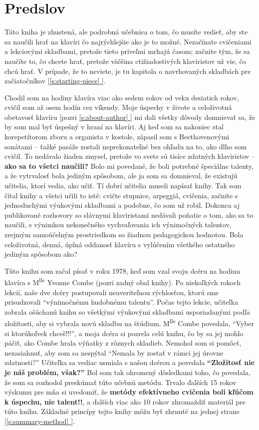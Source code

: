 \documentclass[11pt,a4paper]{book}
\newcommand*{\fullref}[1]{\hyperref[{#1}]{\ref*{#1} \nameref*{#1}}} %
\newcommand*{\fullrefp}[1]{[\fullref{#1}]} %
\begin{document}
\chapter*{Predslov}
Táto kniha je zhustená, ale podrobná učebnica o tom, čo musíte vedieť, aby ste sa naučili hrať na klavíri čo najrýchlejšie ako je to možné. Nezačínate cvičeniami a lekciovými skladbami, pretože tieto priveľmi mrhajú časom; začnite tým, že sa naučíte to, čo chcete hrať, pretože väčšina ctižiadostivých klaviristov už vie, čo chcú hrať. V prípade, že to neviete, je tu kapitola o navrhovaných skladbách pre začiatočníkov \fullrefp{s:starting-piece}.

Chodil som na hodiny klavíra viac ako sedem rokov od veku desiatich rokov, cvičil som až osem hodín cez víkendy. Moje úspechy v živote a celoživotná obetavosť klavíru [pozri \fullref{s:about-author}] mi dali všetky dôvody domnievať sa, že by som mal byť úspešný v hraní na klavíri. Aj keď som sa nakoniec stal korepetítorom zboru a organista v kostole, zápasil som s Beethovenovými sonátami – ťažké pasáže zostali neprekonateľné bez ohľadu na to, ako dlho som cvičil. To nedávalo žiaden zmysel, pretože vo svete sú tisíce zdatných klaviristov – \textbf{ako sa to všetci naučili?} Bolo mi povedané, že boli potrebné špeciálne talenty, a že vytrvalosť bola jediným spôsobom, ale ja som sa domnieval, že existujú učitelia, ktorí vedia, ako učiť. Tí dobrí učitelia museli napísať knihy. Tak som čítal knihy a všetci učili to isté: cvičte stupnice, arpeggiá, cvičenia, začnite s jednoduchými výukovými skladbami a podobne, čo som už robil. Dokonca aj publikované rozhovory so slávnymi klaviristami nedávali poňatie o tom, ako sa to naučili, s výnimkou nekonečného vychvaľovania ich výnimočných talentov, zrejmým samoúčelným prostriedkom so žiadnou pedagogickou hodnotou. Bola celoživotná, denná, úplná oddanosť klavíru s vylúčením všetkého ostatného jediným spôsobom ako?

Túto knihu som začal písať v roku 1978, keď som vzal svoju dcéru na hodinu klavíra s M\textsuperscript{lle} Yvonne Combe (pozri zadný obal knihy). Po niekoľkých rokoch lekcií, naše dve dcéry postupovali neuveriteľnou rýchlosťou, ktorú sme prisudzovali “výnimočnému hudobnému talentu”. Počas tejto lekcie, učiteľka zobrala ošúchanú knihu so všetkými výukovými skladbami usporiadanými podľa zložitosti, aby si vybrala novú skladbu na štúdium. M\textsuperscript{lle} Combe povedala, “Vyber si ktorúkoľvek chceš{\noligatures !!!}”, a moja dcéra si pozrela celú knihu, čo by sa jej mohlo páčiť, ako Combe hrala výňatky z rôznych skladieb. Nemohol som si pomôcť, nezasiahnuť, aby som sa nespýtal “Nemala by zostať v rámci jej úrovne zdatnosti?” Učiteľka sa vediac usmiala s našou dcérou a povedala \textbf{“Zložitosť nie je náš problém, však?”} Bol som tak ohromený dôsledkami toho, čo povedala, že som sa rozhodol preskúmať túto učebnú metódu. Trvalo ďalších 15 rokov výskumu pre mňa si uvedomiť, že \textbf{metódy efektívneho cvičenia boli kľúčom k úspechu, nie talent{\noligatures !!}}, a ďalších viac ako 10 rokov zhromaždiť materiál pre túto knihu. Základné princípy tejto knihy môžu byť zhrnuté na jednej strane \fullrefp{s:summary-method}.
\end{document}
